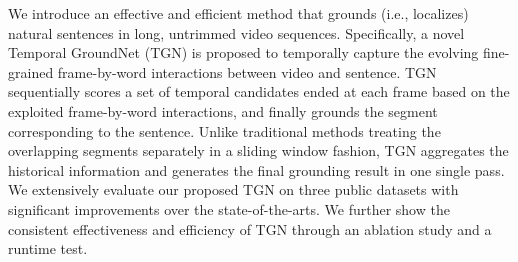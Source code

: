 We introduce an effective and efficient method that grounds (i.e., localizes) natural sentences in long, untrimmed video sequences. Specifically, a novel Temporal GroundNet (TGN) is proposed to temporally capture the evolving fine-grained frame-by-word interactions between video and sentence. TGN sequentially scores a set of temporal candidates ended at each frame based on the exploited frame-by-word interactions, and finally grounds the segment corresponding to the sentence. Unlike traditional methods treating the overlapping segments separately in a sliding window fashion, TGN aggregates the historical information and generates the final grounding result in one single pass. We extensively evaluate our proposed TGN on three public datasets with significant improvements over the state-of-the-arts. We further show the consistent effectiveness and efficiency of TGN through an ablation study and a runtime test.
